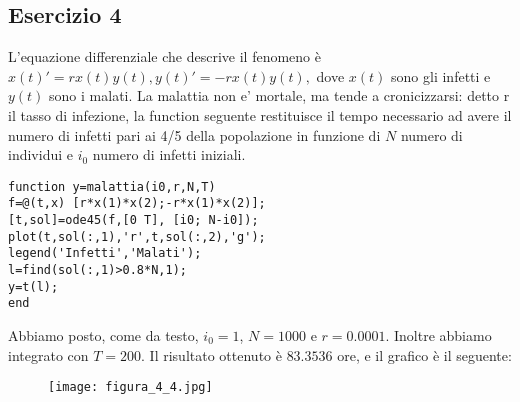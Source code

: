 \documentclass{article}
\begin{document}
\subsection*{Esercizio 4}
L'equazione differenziale che descrive il fenomeno \`{e} $x(t)'=rx(t)y(t),y(t)'=-rx(t)y(t),$ dove $x(t)$ sono gli infetti e $y(t)$ sono i malati. La malattia non e' mortale, ma tende a cronicizzarsi: detto r il tasso di infezione, la function seguente restituisce il tempo necessario ad avere il numero di infetti pari ai 4/5 della popolazione in funzione di $N$ numero di individui e $i_{0}$ numero di infetti iniziali.
\begin{lstlisting}
function y=malattia(i0,r,N,T)
f=@(t,x) [r*x(1)*x(2);-r*x(1)*x(2)];
[t,sol]=ode45(f,[0 T], [i0; N-i0]);
plot(t,sol(:,1),'r',t,sol(:,2),'g');
legend('Infetti','Malati');
l=find(sol(:,1)>0.8*N,1);
y=t(l);
end
\end{lstlisting}
Abbiamo posto, come da testo, $i_{0}=1$, $N=1000$ e $r=0.0001$. Inoltre abbiamo integrato con $T=200$. Il risultato ottenuto è $83.3536$ ore, e il grafico è il seguente:
\begin{figure}[!h]
\centering
\texttt{[image: figura\_4\_4.jpg]}
\end{figure}
\end{document}
